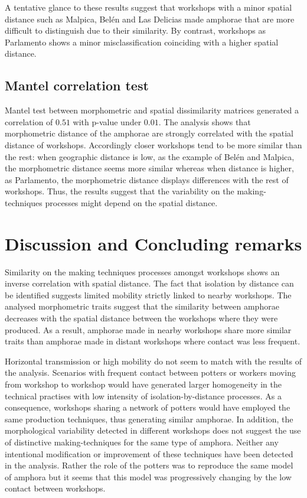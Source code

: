 \documentclass[review]{elsarticle}
\begin{document}
A tentative glance to these results suggest that workshops with a minor spatial distance such as Malpica, Belén and Las Delicias made amphorae that are more difficult to distinguish due to their similarity. By contrast, workshops as Parlamento shows a minor misclassification coinciding with a higher spatial distance. 

\subsection{Mantel correlation test}

Mantel test between morphometric and spatial dissimilarity matrices generated a correlation of $0.51$ with p-value under $0.01$. The analysis shows that morphometric distance of the amphorae are strongly correlated with the spatial distance of workshops. Accordingly closer workshops tend to be more similar than the rest: when geographic distance is low, as the example of Belén and Malpica, the morphometric distance seems more similar whereas when distance is higher, as Parlamento, the morphometric distance displays differences with the rest of workshops. Thus, the results suggest that the variability on the making-techniques processes might depend on the spatial distance.   

\section{Discussion and Concluding remarks}

Similarity on the making techniques processes amongst workshops shows an inverse correlation with spatial distance. The fact that isolation by distance can be identified suggests limited mobility strictly linked to nearby workshops. The analysed morphometric traits suggest that the similarity between amphorae decreases with the spatial distance between the workshops where they were produced. As a result, amphorae made in nearby workshops share more similar traits than amphorae made in distant workshops where contact was less frequent. 

Horizontal transmission or high mobility do not seem to match with the results of the analysis. Scenarios with frequent contact between potters or workers moving from workshop to workshop would have generated larger homogeneity in the technical practises with low intensity of isolation-by-distance processes. As a consequence, workshops sharing a network of potters would have employed the same production techniques, thus generating similar amphorae. 
In addition, the morphological variability detected in different workshops does not suggest the use of distinctive making-techniques for the same type of amphora. Neither any intentional modification or improvement of these techniques have been detected in the analysis. Rather the role of the potters was to reproduce the same model of amphora but it seems that this model was progressively changing by the low contact between workshops.
  
\end{document}
